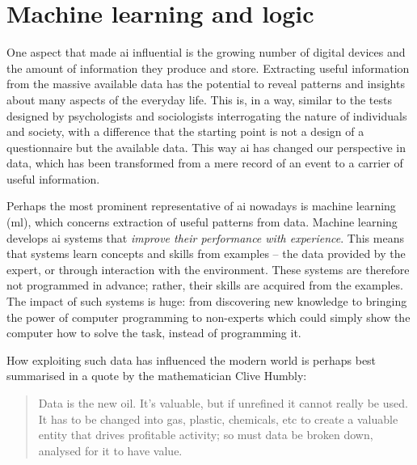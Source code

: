 \section{Machine learning and logic}
\label{sec:intro_ml}


One aspect that made \gls{ai} influential is the growing number of digital devices and the amount of information they produce and store.
Extracting useful information from the massive available data has the potential to reveal patterns and insights about many aspects of the everyday life.
This is, in a way, similar to the tests designed by psychologists and sociologists interrogating the nature of individuals and society, with a difference that the starting point is not a design of a questionnaire but the available data.
This way \gls{ai} has changed our perspective in data, which has been transformed from a mere record of an event to a carrier of useful information.

Perhaps the most prominent representative of \gls{ai} nowadays is machine learning (\gls{ml}), which concerns extraction of useful patterns from data.
Machine learning develops \gls{ai} systems that \textit{improve their performance with experience}.
This means that systems learn concepts and skills from examples -- the data provided by the expert, or through interaction with the environment.
These systems are therefore not programmed in advance; rather, their skills are acquired from the examples.
The impact of such systems is huge: from discovering new knowledge to bringing the power of computer programming to non-experts which could simply show the computer how to solve the task, instead of programming it.



How exploiting such data has influenced the modern world is perhaps best summarised  in a quote by the mathematician Clive Humbly:
\begin{quote}
	Data is the new oil. It’s valuable, but if unrefined it cannot really be used. It has to be changed into gas, plastic, chemicals, etc to create a valuable entity that drives profitable activity; so must data be broken down, analysed for it to have value.
\end{quote}




